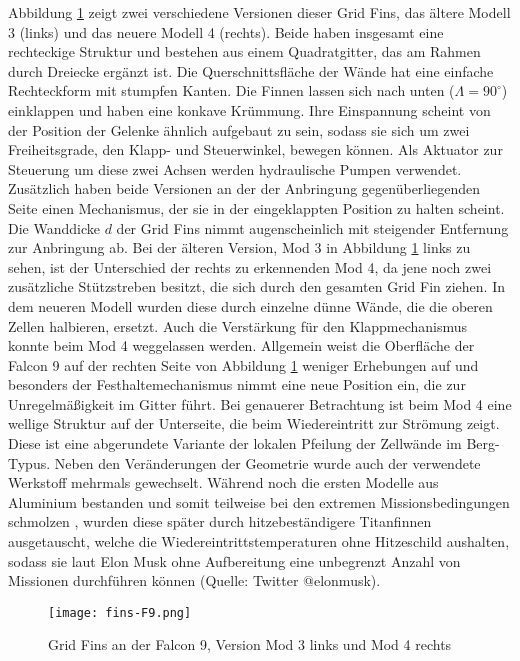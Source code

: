 Abbildung \ref{abb_finsF9} zeigt zwei verschiedene Versionen dieser Grid Fins, das ältere Modell 3 (links) und das neuere Modell 4 (rechts). Beide haben insgesamt eine rechteckige Struktur und bestehen aus einem Quadratgitter, das am Rahmen durch Dreiecke ergänzt ist. Die Querschnittsfläche der Wände hat eine einfache Rechteckform mit stumpfen Kanten. Die Finnen lassen sich nach unten ($\Lambda = 90^\circ$) einklappen und haben eine konkave Krümmung. Ihre Einspannung scheint von der Position der Gelenke ähnlich aufgebaut zu sein, sodass sie sich um zwei Freiheitsgrade, den Klapp- und Steuerwinkel, bewegen können. Als Aktuator zur Steuerung um diese zwei Achsen werden hydraulische Pumpen verwendet. Zusätzlich haben beide Versionen an der der Anbringung gegenüberliegenden Seite einen Mechanismus, der sie in der eingeklappten Position zu halten scheint. Die Wanddicke $d$ der Grid Fins nimmt augenscheinlich mit steigender Entfernung zur Anbringung ab. Bei der älteren Version, Mod 3 in Abbildung \ref{abb_finsF9} links zu sehen, ist der Unterschied der rechts zu erkennenden Mod 4, da jene noch zwei zusätzliche Stützstreben besitzt, die sich durch den gesamten Grid Fin ziehen. In dem neueren Modell wurden diese durch einzelne dünne Wände, die die oberen Zellen halbieren, ersetzt. Auch die Verstärkung für den Klappmechanismus konnte beim Mod 4 weggelassen werden. Allgemein weist die Oberfläche der Falcon 9 auf der rechten Seite von Abbildung \ref{abb_finsF9} weniger Erhebungen auf und besonders der Festhaltemechanismus nimmt eine neue Position ein, die zur Unregelmäßigkeit im Gitter führt. Bei genauerer Betrachtung ist beim Mod 4 eine wellige Struktur auf der Unterseite, die beim Wiedereintritt zur Strömung zeigt. Diese ist eine abgerundete Variante der lokalen Pfeilung der Zellwände im Berg-Typus. Neben den Veränderungen der Geometrie wurde auch der verwendete Werkstoff mehrmals gewechselt. Während noch die ersten Modelle aus Aluminium bestanden und somit teilweise bei den extremen Missionsbedingungen schmolzen \cite{titanium}, wurden diese später durch hitzebeständigere Titanfinnen ausgetauscht, welche die Wiedereintrittstemperaturen ohne Hitzeschild aushalten, sodass sie laut Elon Musk ohne Aufbereitung eine unbegrenzt Anzahl von Missionen durchführen können (Quelle: Twitter @elonmusk).
\begin{figure}[h]
	\centering
	\texttt{[image: fins-F9.png]}
	\begin{flushright}
	\end{flushright}
	\caption{Grid Fins an der Falcon 9, Version Mod 3 links und Mod 4 rechts}
	\label{abb_finsF9}
\end{figure}\\
